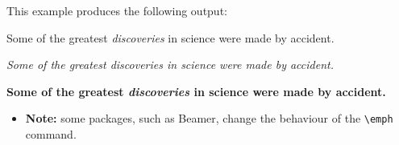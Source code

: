 This example produces the following output:

\begin{mdframed}
    Some of the greatest \emph{discoveries} in science 
    were made by accident.

    \textit{Some of the greatest \emph{discoveries} 
    in science were made by accident.}

    \textbf{Some of the greatest \emph{discoveries} 
    in science were made by accident.}
\end{mdframed}

\begin{itemize}
    \item \textbf{Note:} some packages, such as Beamer, change the behaviour of the \verb|\emph| command.
\end{itemize}